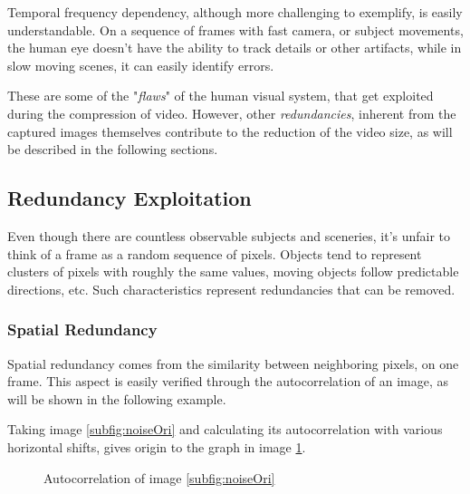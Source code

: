 Temporal frequency dependency, although more challenging to exemplify, is easily understandable. On a sequence of frames with fast camera, or subject movements, the human eye doesn't have the ability to track details or other artifacts, while in slow moving scenes, it can easily identify errors.

These are some of the "\emph{flaws}" of the human visual system, that get exploited during the compression of video. However, other \emph{redundancies}, inherent from the captured images themselves contribute to the reduction of the video size, as will be described in the following sections.

\subsection{Redundancy Exploitation}


Even though there are countless observable subjects and sceneries, it's unfair to think of a frame as a random sequence of pixels. Objects tend to represent clusters of pixels with roughly the same values, moving objects follow predictable directions, etc. Such characteristics represent redundancies that can be removed.

\subsubsection{Spatial Redundancy} \label{sssec:spatred}

Spatial redundancy comes from the similarity between neighboring pixels, on one frame. This aspect is easily verified through the autocorrelation of an image, as will be shown in the following example.

Taking image \ref{subfig:noiseOri} and calculating its autocorrelation with various horizontal shifts, gives origin to the graph in image \ref{fig:autocorr}.

\begin{figure}[h]
    \centering
    \caption{Autocorrelation of image \ref{subfig:noiseOri}}
    \label{fig:autocorr}
\end{figure}

